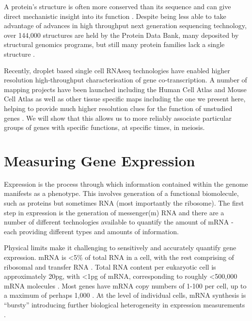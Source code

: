 A protein's structure is often more conserved than its sequence and can give direct mechanistic insight into its function \parencite{Illergard2009Structure, Sousounis2012Conservation}.
Despite being less able to take advantage of advances in high throughput next generation sequencing technology, over 144,000 structures are held by the Protein Data Bank, many deposited by structural genomics programs, but still many protein families lack a single structure \parencite{wwPDBconsortium2019Protein, Grabowski2016Impact, Khafizov2014Trends}.

Recently, droplet based single cell RNAseq technologies have enabled higher resolution high-throughput characterisation of gene co-transcription.
A number of mapping projects have been launched including the Human Cell Atlas and Mouse Cell Atlas as well as other tissue specific maps including the one we present here, helping to provide much higher resolution clues for the function of unstudied genes \parencite{Regev2017Human,Regev2018Human,Han2018Mapping,TheTabulaMurisConsortium2018Singlecell}.
We will show that this allows us to more reliably associate particular groups of genes with specific functions, at specific times, in meiosis.


\section{Measuring Gene Expression}

Expression is the process through which information contained within the genome manifests as a phenotype.
This involves generation of a functional biomolecule, such as proteins but sometimes RNA (most importantly the ribosome).
The first step in expression is the generation of messenger(m) RNA and there are a number of different technologies available to quantify the amount of mRNA - each providing different types and amounts of information.

Physical limits make it challenging to sensitively and accurately quantify gene expression.
mRNA is <5\% of total RNA in a cell, with the rest comprising of ribosomal and transfer RNA \parencite{Warner1999economics}.
Total RNA content per eukaryotic cell is approximately 20pg, with <1pg of mRNA, corresponding to roughly <500,000 mRNA molecules \parencite{Roozemond1976Ultramicrochemical, Uemura1980Agerelated, Tang2011Development}.
Most genes have mRNA copy numbers of 1-100 per cell, up to a maximum of perhaps 1,000 \parencite{Marguerat2012Quantitative, Macaulay2014Single}.
At the level of individual cells, mRNA synthesis is ``bursty'' introducing further biological heterogeneity in expression measurements \parencite{Raj2006Stochastic, Chubb2006Transcriptional}.

